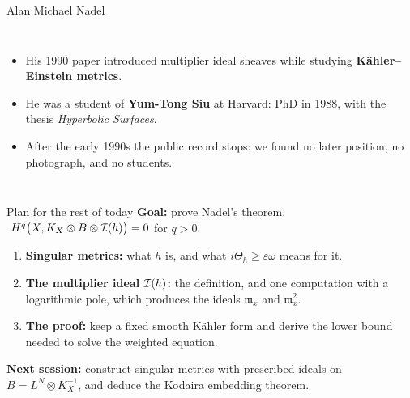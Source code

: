 \begin{frame}{Alan Michael Nadel}
\begin{columns}[c]
\centering
{}
\begin{itemize}
\setlength{\itemsep}{16pt}
\item His 1990 paper introduced multiplier ideal sheaves while studying \textbf{Kähler--Einstein metrics}.
\item He was a student of \textbf{Yum-Tong Siu} at Harvard: PhD in 1988, with the thesis \emph{Hyperbolic Surfaces}.
\item After the early 1990s the public record stops: we found no later position, no photograph, and no students.
\end{itemize}
\end{columns}
\end{frame}

\begin{frame}{Plan for the rest of today}
\textbf{Goal:} prove Nadel's theorem,
\(\ H^q\bigl(X,K_X\otimes B\otimes\mathcal I(h)\bigr)=0\) for \(q>0\).
\par\medskip
\begin{enumerate}
\setlength{\itemsep}{9pt}
\item \textbf{Singular metrics:} what \(h\) is, and what \(i\Theta_h\ge\varepsilon\omega\) means for it.
\item \textbf{The multiplier ideal \(\mathcal I(h)\):} the definition, and one computation with a logarithmic pole, which produces the ideals \(\mathfrak m_x\) and \(\mathfrak m_x^2\).
\item \textbf{The proof:} keep a fixed smooth Kähler form and derive the lower bound needed to solve the weighted equation.
\end{enumerate}
\par\medskip
\textbf{Next session:} construct singular metrics with prescribed ideals on \(B=L^N\otimes K_X^{-1}\), and deduce the Kodaira embedding theorem.
\end{frame}

